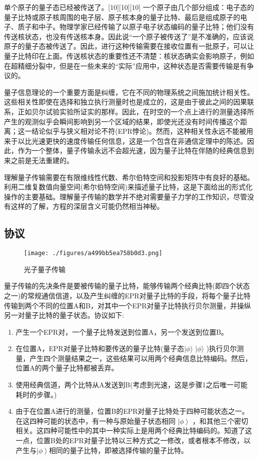 单个原子的量子态已经被传送了。[10][10][10] 一个原子由几个部分组成：电子态的量子比特或原子核周围的电子层、原子核本身的量子比特、最后是组成原子的电子、质子和中子。物理学家已经传输了以原子电子状态编码的量子比特；他们没有传送核状态，也没有传送核本身。因此说“一个原子被传送了”是不准确的，应该说原子的量子态被传送了。因此，进行这种传输需要在接收位置有一批原子，可以让量子比特印在上面。传送核状态的重要性还不清楚：核状态确实会影响原子，例如在超精细分裂中，但是在一些未来的“实际”应用中，这种状态是否需要传输是有争议的。



量子信息理论的一个重要方面是纠缠，它在不同的物理系统之间施加统计相关性。这些相关性即使在选择和独立执行测量时也是成立的，这是由于彼此之间的因果联系，正如贝尔试验实验所证实的那样。因此，在时空的一个点上进行的测量选择所产生的观测似乎会瞬间影响到另一个区域的结果，即使光还没有时间传播这个距离；这一结论似乎与狭义相对论不符(EPR悖论)。然而，这种相关性永远不能被用来于以比光速更快的速度传输任何信息，这是一个包含在非通信定理中的陈述。因此，作为一个整体，量子传输永远不会超光速，因为量子比特在伴随的经典信息到来之前是无法重建的。

理解量子传输需要在有限维线性代数、希尔伯特空间和投影矩阵中有良好的基础。利用二维复数值向量空间(希尔伯特空间)来描述量子比特，这是下面给出的形式化操作的主要基础。理解量子传输的数学并不绝对需要量子力学的工作知识，尽管没有这样的了解，方程的深层含义可能仍然相当神秘。

\subsection{协议}

\begin{figure}[ht]
\centering
\texttt{[image: ./figures/a499bb5ea758b0d3.png]}
\caption{光子量子传输} \label{fig_LZYXCT_3}
\end{figure}

量子传输的先决条件是要被传输的量子比特，能够传输两个经典比特(即四个状态之一)的常规通信信道，以及产生纠缠的EPR对量子比特的手段，将每个量子比特传输到两个不同的位置A和B，对其中一个EPR对量子比特执行贝尔测量，并操纵另一对量子比特的量子状态。协议如下:

\begin{enumerate}
\item 产生一个EPR对，一个量子比特发送到位置A，另一个发送到位置B。
\item 在位置A，EPR对量子比特和要传送的量子比特(量子态$\displaystyle |\phi \rangle $ $\displaystyle |\phi \rangle$ )执行贝尔测量，产生四个测量结果之一，这些结果可以用两个经典信息比特编码。然后，位置A的两个量子比特都被丢弃。
\item 使用经典信道，两个比特从A发送到B(考虑到光速，这是步骤1之后唯一可能耗时的步骤。)
\item 由于在位置A进行的测量，位置B的EPR对量子比特处于四种可能状态之一。在这四种可能的状态中，有一种与原始量子状态相同 $\left| \phi \right\rangle$ ，和其他三个密切相关。这四种可能性中的其中一种实际上是用两个经典比特编码的。知道了这一点，位置B处的EPR对量子比特以三种方式之一修改，或者根本不修改，以产生与$\left| \phi \right\rangle$相同的量子比特，即被选择传输的量子比特。
\end{enumerate}

